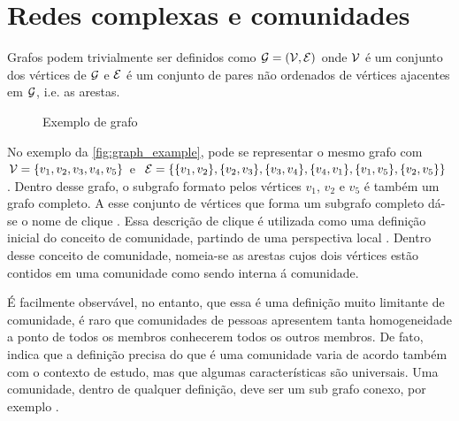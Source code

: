 \documentclass[notes.tex]{subfiles}
\begin{document}
\section{Redes complexas e comunidades}

Grafos podem trivialmente ser definidos como $\operatorname{\mathcal{G}} = (\operatorname{\mathcal{V}}, \operatorname{\mathcal{E}})$ onde $\operatorname{\mathcal{V}}$ é um conjunto dos vértices de  $\operatorname{\mathcal{G}}$ e  $\operatorname{\mathcal{E}}$ é um conjunto de pares não ordenados de vértices ajacentes em $\operatorname{\mathcal{G}}$, i.e. as arestas.

\begin{figure}[htpb]
    \centering
    \caption{Exemplo de grafo}\label{fig:graph_example}
\end{figure}

No exemplo da \autoref{fig:graph_example}, pode se representar o mesmo grafo com $\operatorname{\mathcal{V}} = \{v_1, v_2, v_3, v_4, v_5\}$ e $\operatorname{\mathcal{E}} = \{\{v_1, v_2\}, \{v_2, v_3\}, \{v_3, v_4\}, \{v_4, v_1\}, \{v_1, v_5\}, \{v_2, v_5\}\}$.
Dentro desse grafo, o subgrafo formato pelos vértices $v_1$, $v_2$ e $v_5$ é também um grafo completo.
A esse conjunto de vértices que forma um subgrafo completo dá-se o nome de clique \cite{fortunato2010community}.
Essa descrição de clique é utilizada como uma definição inicial do conceito de comunidade, partindo de uma perspectiva local \cite{fortunato2010community}.
Dentro desse conceito de comunidade, nomeia-se as arestas cujos dois vértices estão contidos em uma comunidade como sendo interna á comunidade.

É facilmente observável, no entanto, que essa é uma definição muito limitante de comunidade, é raro que comunidades de pessoas apresentem tanta homogeneidade a ponto de todos os membros conhecerem todos os outros membros.
De fato,  indica que a definição precisa do que é uma comunidade varia de acordo também com o contexto de estudo, mas que algumas características são universais.
Uma comunidade, dentro de qualquer definição, deve ser um sub grafo conexo, por exemplo \cite{fortunato2010community}. 
\end{document}
